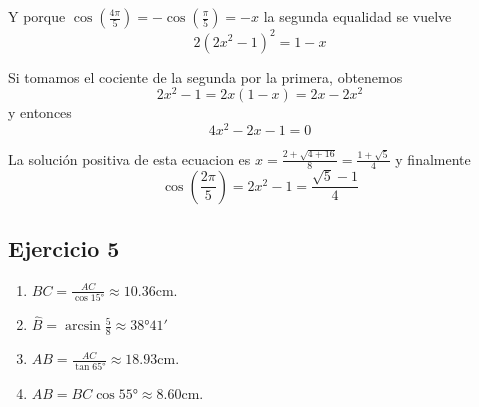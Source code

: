 \begin{enumerate}
Y porque $\cos\left(\frac{4\pi}{5}\right) = -\cos\left(\frac{\pi}{5}\right) = -x$ la segunda equalidad se vuelve
$$2\left(2x^2-1\right)^2 = 1 - x$$

Si tomamos el cociente de la segunda por la primera, obtenemos
$$
2x^2 - 1 = {2x\left(1 - x \right)} = 2x - 2x^2
$$
y entonces
$$
4x^2 - 2x - 1 = 0
$$

La solución positiva de esta ecuacion es $x = \frac{2 + \sqrt{4+16}}{8} = 
\frac{1+\sqrt{5}}{4}$ y finalmente
  $$
  {\cos \left(\frac{2\pi}{5}\right)} = {2x^2 - 1} = \frac{\sqrt{5}-1}{4}
  $$

\end{enumerate}

\subsection{Ejercicio 5}

\begin{enumerate}
\item $BC = \frac{AC}{\cos 15°} \approx 10.36\text{cm}$.
\item $\widehat{B} = \arcsin \frac{5}{8} \approx 38°41'$
\item $AB = \frac{AC}{\tan 65°} \approx 18.93\text{cm}$.
\item $AB = BC {\cos 55°} \approx 8.60\text{cm}$.
\end{enumerate}
